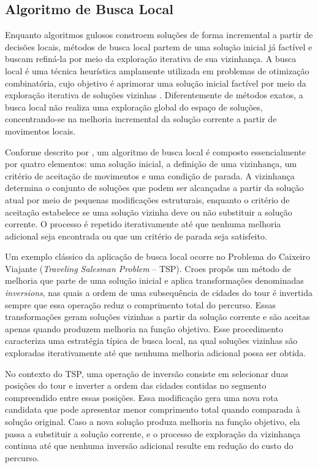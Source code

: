 \subsection{Algoritmo de Busca Local}

Enquanto algoritmos gulosos constroem soluções de forma incremental a partir de decisões locais, métodos de busca local partem de uma solução inicial 
já factível e buscam refiná-la por meio da exploração iterativa de sua vizinhança. A busca local é uma técnica heurística amplamente utilizada em problemas 
de otimização combinatória, cujo objetivo é aprimorar uma solução inicial factível por meio da exploração iterativa de soluções vizinhas \cite{Gendreau2010}. 
Diferentemente de métodos exatos, a busca local não realiza uma exploração global do espaço de soluções, concentrando-se na melhoria incremental da 
solução corrente a partir de movimentos locais.

Conforme descrito por \cite{Gendreau2010}, um algoritmo de busca local é composto essencialmente por quatro elementos: uma solução inicial, 
a definição de uma vizinhança, um critério de aceitação de movimentos e uma condição de parada. A vizinhança determina o conjunto de soluções que 
podem ser alcançadas a partir da solução atual por meio de pequenas modificações estruturais, enquanto o critério de aceitação estabelece 
se uma solução vizinha deve ou não substituir a solução corrente. O processo é repetido iterativamente até que nenhuma melhoria adicional 
seja encontrada ou que um critério de parada seja satisfeito.

Um exemplo clássico da aplicação de busca local ocorre no Problema do Caixeiro Viajante (\textit{Traveling Salesman Problem} -- TSP). 
Croes \cite{Croes1958} propôs um método de melhoria que parte de uma solução inicial e aplica transformações denominadas 
\textit{inversions}, nas quais a ordem de uma subsequência de cidades do tour é invertida sempre que essa operação reduz o comprimento total do percurso. 
Essas transformações geram soluções vizinhas a partir da solução corrente e são aceitas apenas quando produzem melhoria na função objetivo. 
Esse procedimento caracteriza uma estratégia típica de busca local, na qual soluções vizinhas são exploradas iterativamente até que 
nenhuma melhoria adicional possa ser obtida.

No contexto do TSP, uma operação de inversão consiste em selecionar duas posições do tour e inverter a ordem das cidades contidas no 
segmento compreendido entre essas posições. Essa modificação gera uma nova rota candidata que pode apresentar menor comprimento total 
quando comparada à solução original. Caso a nova solução produza melhoria na função objetivo, ela passa a substituir a solução corrente, 
e o processo de exploração da vizinhança continua até que nenhuma inversão adicional resulte em redução do custo do percurso.


